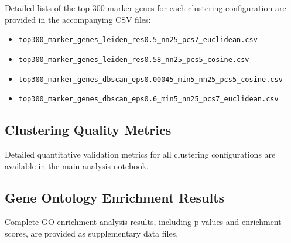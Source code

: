 \documentclass[12pt,a4paper]{article}
\begin{document}
Detailed lists of the top 300 marker genes for each clustering configuration are provided in the accompanying CSV files:

\begin{itemize}
\item \texttt{top300\_marker\_genes\_leiden\_res0.5\_nn25\_pcs7\_euclidean.csv}
\item \texttt{top300\_marker\_genes\_leiden\_res0.58\_nn25\_pcs5\_cosine.csv}
\item \texttt{top300\_marker\_genes\_dbscan\_eps0.00045\_min5\_nn25\_pcs5\_cosine.csv}
\item \texttt{top300\_marker\_genes\_dbscan\_eps0.6\_min5\_nn25\_pcs7\_euclidean.csv}
\end{itemize}

\subsection{Clustering Quality Metrics}

Detailed quantitative validation metrics for all clustering configurations are available in the main analysis notebook.

\subsection{Gene Ontology Enrichment Results}

Complete GO enrichment analysis results, including p-values and enrichment scores, are provided as supplementary data files.
\end{document}
